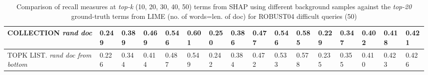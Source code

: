 \begin{table}
{\begin{tabular}{ |m{6em}|m{2.8em}|m{2.8em}|m{2.8em}|m{2.8em}|m{2.8em}||m{2.8em}|m{2.8em}|m{2.8em}|m{2.8em}|m{2.8em}||m{2.8em}|m{2.8em}|m{2.8em}|m{2.8em}|m{2.8em}|| }



COLLECTION \newline \textit{rand doc} & 0.249 & 0.389 & 0.469 & 0.546 & 0.601 & 0.250 & 0.386 & 0.477 & 0.546 & 0.585 & 0.229 & 0.347 & 0.402 & 0.418 & 0.421\\
\hline

TOPK LIST. \newline \textit{rand doc from bottom} & 0.226 & 0.344 & 0.414 & 0.487 & 0.549 & 0.242 & 0.384 & 0.472 & 0.533 & 0.578 & 0.235 & 0.355 & 0.410 & 0.423 & 0.426\\
\hline

 \end{tabular}}
\caption{Comparison of recall measures at \textit{top-k} (10, 20, 30, 40, 50) terms from SHAP using different background samples against the \textit{top-20} ground-truth terms from LIME (no. of words=len. of doc) for ROBUST04 difficult queries (50)}
\label{table_diff_20_terms_recall_diff}
\end{table}

